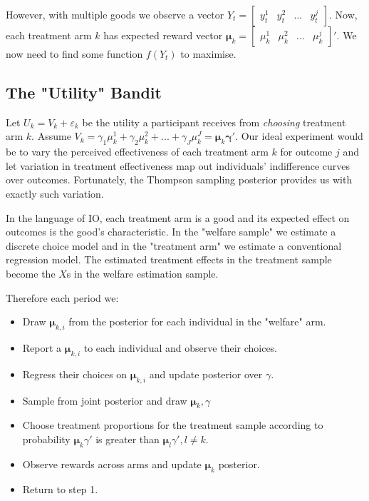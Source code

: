 \documentclass{article}
\begin{document}
However, with multiple goods we observe a  vector  $Y_t = \begin{bmatrix} y^1_t & y^2_t & ... & y^j_t\end{bmatrix}$.
Now, each treatment arm $k$ has expected reward vector $\bm{\mu}_k = \begin{bmatrix}
    \mu^1_k & \mu^2_k & ... & \mu^j_k
\end{bmatrix}'$. We now need to find some function $f(Y_t)$ to maximise. 

\subsection*{The "Utility" Bandit}

Let $U_k = V_k + \varepsilon_k$ be the utility a 
participant receives from \textit{choosing} treatment arm $k$. Assume $V_k = 
\gamma_1 \mu^1_k + \gamma_2 \mu^2_k + ... + \gamma_J \mu^J_k = \bm{\mu}_k\bm{\gamma}'$. Our ideal experiment would be to vary the perceived effectiveness of each treatment arm $k$ for 
outcome $j$ and let variation in treatment effectiveness map out individuals' 
indifference curves over outcomes. Fortunately, the Thompson sampling posterior 
provides us with exactly such variation.


In the language of IO, each treatment arm is a good and its expected effect on outcomes 
is the good's characteristic. In the "welfare sample" we estimate a discrete choice model 
and in the "treatment arm" we estimate a conventional regression model. The estimated treatment effects in the treatment sample 
become the $X$s in the welfare estimation sample.

Therefore each period we:

    \begin{itemize}
        \item Draw $\bm{\mu}_{k, i}$ from the posterior for each individual in the "welfare" arm. 
        \item Report a $\bm{\mu}_{k, i}$ to each individual and observe their choices.
        \item Regress their choices on $\bm{\mu}_{k,i}$ and update posterior over $\gamma$.
        \item Sample from joint posterior and draw $\bm{\mu}_{k}, \gamma$
        \item Choose treatment proportions for the treatment sample according to probability  $\bm{\mu}_k \gamma'$ is 
        greater than $\bm{\mu}_l \gamma', l \neq k$.
        \item Observe rewards across arms and update $\bm{\mu}_k$ posterior.
        \item Return to step 1.
         \end{itemize}
\end{document}
